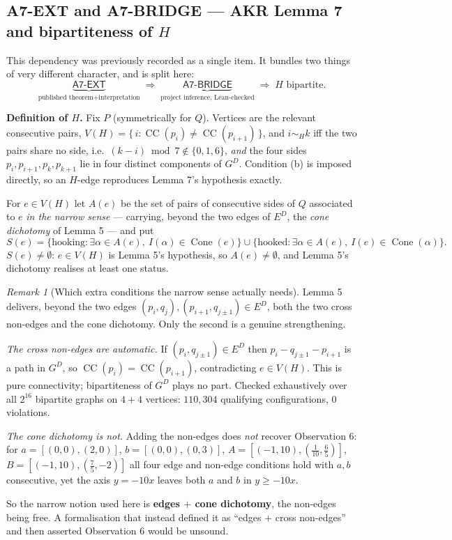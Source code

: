 \documentclass[11pt,a4paper]{article}
\theoremstyle{plain}
\theoremstyle{definition}
\theoremstyle{remark}
\newtheorem*{remark}{Remark}
\newcommand{\GD}{G^{D}}
\newcommand{\ED}{E^{D}}
\newcommand{\Cone}{\operatorname{Cone}}
\newcommand{\CC}{\operatorname{CC}}
\begin{document}
\subsection{\texorpdfstring{\textsf{A7-EXT} and \textsf{A7-BRIDGE} --- AKR Lemma 7 and bipartiteness of $H$}{A7-EXT and A7-BRIDGE -- AKR Lemma 7 and bipartiteness of H}}\label{sec:a7ext}

This dependency was previously recorded as a single item. It bundles two things
of very different character, and is split here:
\[
  \underbrace{\textsf{A7-EXT}}_{\text{published theorem}+\text{interpretation}}
  \;\Longrightarrow\;
  \underbrace{\textsf{A7-BRIDGE}}_{\text{project inference, Lean-checked}}
  \;\Longrightarrow\;
  H \text{ bipartite}.
\]

\textbf{Definition of $H$.} Fix $P$ (symmetrically for $Q$). Vertices are the
relevant consecutive pairs, $V(H)=\{\,i : \CC(p_i)\neq\CC(p_{i+1})\,\}$, and
$i\sim_H k$ iff the two pairs share no side, i.e.\ $(k-i)\bmod 7\notin\{0,1,6\}$,
\emph{and} the four sides $p_i,p_{i+1},p_k,p_{k+1}$ lie in four distinct
components of $\GD$. Condition (b) is imposed directly, so an $H$-edge reproduces
Lemma 7's hypothesis exactly.

For $e\in V(H)$ let $A(e)$ be the set of pairs of consecutive sides of $Q$
associated to $e$ \emph{in the narrow sense} --- carrying, beyond the two edges
of $\ED$, the \emph{cone dichotomy} of Lemma 5 --- and put
\[
  S(e)=\{\text{hooking}: \exists\alpha\in A(e),\ I(\alpha)\in\Cone(e)\}
     \cup\{\text{hooked}: \exists\alpha\in A(e),\ I(e)\in\Cone(\alpha)\}.
\]
$S(e)\neq\emptyset$: $e\in V(H)$ is Lemma 5's hypothesis, so $A(e)\neq\emptyset$,
and Lemma 5's dichotomy realises at least one status.

\begin{remark}[Which extra conditions the narrow sense actually needs]\label{rem:narrow}
Lemma 5 delivers, beyond the two edges $(p_i,q_j),(p_{i+1},q_{j\pm1})\in\ED$,
both the two cross non-edges and the cone dichotomy. Only the second is a genuine
strengthening.

\emph{The cross non-edges are automatic.} If $(p_i,q_{j\pm1})\in\ED$ then
$p_i - q_{j\pm1} - p_{i+1}$ is a path in $\GD$, so $\CC(p_i)=\CC(p_{i+1})$,
contradicting $e\in V(H)$. This is pure connectivity; bipartiteness of $\GD$
plays no part. Checked exhaustively over all $2^{16}$ bipartite graphs on $4+4$
vertices: $110{,}304$ qualifying configurations, $0$ violations.

\emph{The cone dichotomy is not.} Adding the non-edges does \emph{not} recover
Observation 6: for
$a=[(0,0),(2,0)]$, $b=[(0,0),(0,3)]$, $A=[(-1,10),(\tfrac1{10},\tfrac65)]$,
$B=[(-1,10),(\tfrac75,-2)]$ all four edge and non-edge conditions hold with $a,b$
consecutive, yet the axis $y=-10x$ leaves both $a$ and $b$ in $y\ge-10x$.

So the narrow notion used here is \textbf{edges $+$ cone dichotomy}, the
non-edges being free. A formalisation that instead defined it as
``edges $+$ cross non-edges'' and then asserted Observation 6 would be unsound.
\end{remark}
\end{document}
